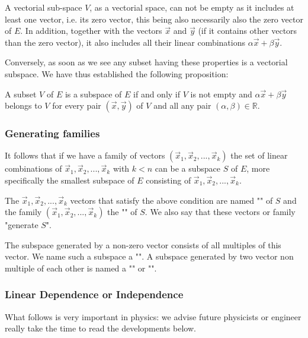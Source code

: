 	A vectorial sub-space $V$, as a vectorial space, can not be empty as it includes at least one vector, i.e. its zero vector, this being also necessarily also the zero vector of $E$. In addition, together with the vectors $\vec{x}$ and $\vec{y}$ (if it contains other vectors than the zero vector), it also includes all their linear combinations $\alpha\vec{x}+\beta\vec{y}$.
	
	Conversely, as soon as we see any subset having these properties is a vectorial subspace. We have thus established the following proposition:
	
	A subset $V$ of $E$ is a subspace of $E$ if and only if $V$ is not empty and $\alpha\vec{x}+\beta\vec{y}$ belongs to $V$ for every pair $(\vec{x},\vec{y})$ of $V$ and all any pair $(\alpha,\beta) \in \mathbb{R}$.
	
	\subsubsection{Generating families}
	It follows that if we have a family of vectors $(\vec{x}_1,\vec{x}_2,...,\vec{x}_k)$ the set of linear combinations of $\vec{x}_1,\vec{x}_2,...,\vec{x}_k$ with $k<n$ can be a subspace $S$ of $E$, more specifically the smallest subspace of $E$ consisting of $\vec{x}_1,\vec{x}_2,...,\vec{x}_k$.
	
	The $\vec{x}_1,\vec{x}_2,...,\vec{x}_k$ vectors that satisfy the above condition are named "" of $S$ and the family $(\vec{x}_1,\vec{x}_2,...,\vec{x}_k)$ the "" of $S$. We also say that these vectors or family "generate $S$".
	
	\begin{tcolorbox}[title=Remark,colframe=black,arc=10pt]
The subspace generated by a non-zero vector consists of all multiples of this vector. We name such a subspace a "". A subspace generated by two vector non multiple of each other is named a "" or "".
	\end{tcolorbox}
	
	\subsubsection{Linear Dependence or Independence}
	What follows is very important in physics: we advise future physicists or engineer really take the time to read the developments below.
	
